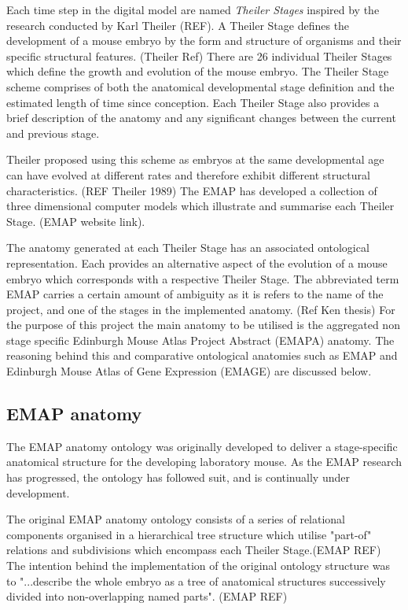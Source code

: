 Each time step in the digital model are named \textit{Theiler Stages} inspired by the research conducted by Karl Theiler (REF). A Theiler Stage defines the development of a mouse embryo by the form and structure of organisms and their specific structural features. (Theiler Ref) There are 26 individual Theiler Stages which define the growth and evolution of the mouse embryo. The Theiler Stage scheme comprises of both the anatomical developmental stage definition and the estimated length of time since conception. Each Theiler Stage also provides a brief description of the anatomy and any significant changes between the current and previous stage.

Theiler proposed using this scheme as embryos at the same developmental age can have evolved at different rates and therefore exhibit different structural characteristics. (REF Theiler 1989) The EMAP has developed a collection of three dimensional computer models which illustrate and summarise each Theiler Stage. (EMAP website link). 

The anatomy generated at each Theiler Stage has an associated ontological representation. Each provides an alternative aspect of the evolution of a mouse embryo which corresponds with a respective Theiler Stage. The abbreviated term EMAP carries a certain amount of ambiguity as it is refers to the name of the project, and one of the stages in the implemented anatomy. (Ref Ken thesis)  For the purpose of this project the main anatomy to be utilised is the aggregated non stage specific Edinburgh Mouse Atlas Project Abstract (EMAPA) anatomy. The reasoning behind this and comparative ontological anatomies such as EMAP and Edinburgh Mouse Atlas of Gene Expression (EMAGE) are discussed below.

\subsection{EMAP anatomy}
The EMAP anatomy ontology was originally developed to deliver a stage-specific anatomical structure for the developing laboratory mouse. As the EMAP research has progressed, the ontology has followed suit, and is continually under development.

The original EMAP anatomy ontology consists of a series of relational components organised in a hierarchical tree structure which utilise "part-of" relations and subdivisions which encompass each Theiler Stage.(EMAP REF) The intention behind the implementation of the original ontology structure was to "...describe the whole embryo as a tree of anatomical structures successively divided into non-overlapping named parts". (EMAP REF)

